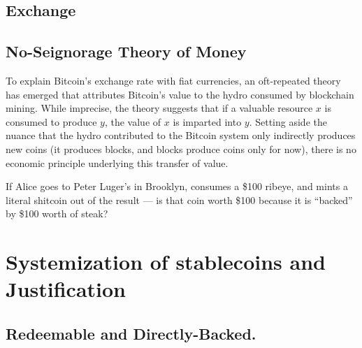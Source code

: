 \subsection{Exchange}

\clearpage
\subsection{No-Seignorage Theory of Money} 

To explain Bitcoin's exchange rate with fiat currencies, an oft-repeated theory has emerged that attributes Bitcoin's value to the hydro consumed by blockchain mining. While imprecise, the theory suggests that if a valuable resource $x$ is consumed to produce $y$, the value of $x$ is imparted into $y$. Setting aside the nuance that the hydro contributed to the Bitcoin system only indirectly produces new coins (it produces blocks, and blocks produce coins only for now), there is no economic principle underlying this transfer of value. 

If Alice goes to Peter Luger's in Brooklyn, consumes a \$100 ribeye, and mints a literal shitcoin out of the result --- is that coin worth \$100 because it is ``backed'' by \$100 worth of steak?


\section{Systemization of stablecoins and Justification}
 \par


 


\subsection{Redeemable and Directly-Backed.} 


